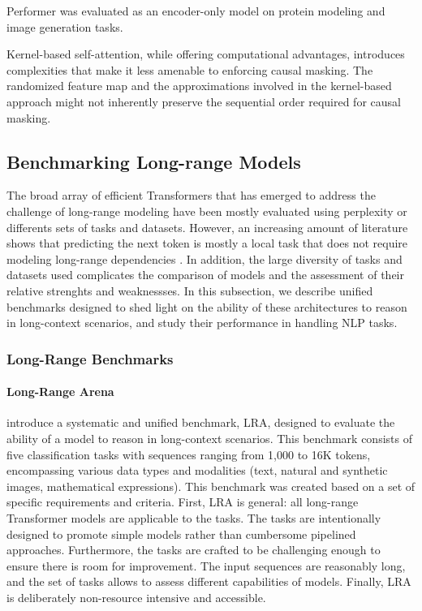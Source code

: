 Performer was evaluated as an encoder-only model on protein modeling \citep{uniprot2019uniprot} and image generation \citep{parmar2018image} tasks. 

Kernel-based self-attention, while offering computational advantages, introduces complexities that make it less amenable to enforcing causal masking. The randomized feature map and the approximations involved in the kernel-based approach might not inherently preserve the sequential order required for causal masking. 



\subsection{Benchmarking Long-range Models}

The broad array of efficient Transformers that has emerged to address the challenge of long-range modeling have been mostly evaluated using perplexity or differents sets of tasks and datasets. However, an increasing
amount of literature shows that predicting the next token is mostly a local task that does not require modeling long-range dependencies \citep{khandelwal2018sharp, sun2021long}. In addition, the large diversity of tasks and datasets used complicates the comparison of models and the assessment of their relative strenghts and weaknessses. In this subsection, we describe unified benchmarks designed to shed light on the ability of these architectures to reason in long-context scenarios, and study their performance in handling \ac{NLP} tasks.

\subsubsection{Long-Range Benchmarks}

\paragraph{Long-Range Arena} \citet{tay2020long} introduce a systematic and unified benchmark, \ac{LRA}, designed to evaluate the ability of a model to reason in long-context scenarios. This benchmark consists of five classification tasks with sequences ranging from 1,000 to 16K tokens, encompassing various data types and modalities (text, natural and synthetic images, mathematical expressions). This benchmark was created based on a set of specific requirements and criteria. First, \ac{LRA} is general: all long-range Transformer models are applicable to the tasks. The tasks are intentionally designed to promote simple models rather than cumbersome pipelined approaches. Furthermore, the tasks are crafted to be challenging enough to ensure there is room for improvement. The input sequences are reasonably long, and the set of tasks allows to assess different capabilities of models. Finally, \ac{LRA} is deliberately non-resource intensive and accessible. 

